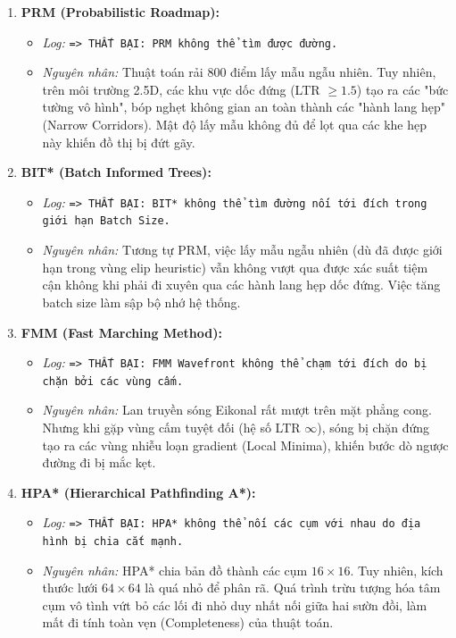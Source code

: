 \documentclass[12pt, a4paper]{article}
\begin{document}
\begin{enumerate}
    \item \textbf{PRM (Probabilistic Roadmap):}
    \begin{itemize}
        \item \textit{Log:} \texttt{=> THẤT BẠI: PRM không thể tìm được đường.}
        \item \textit{Nguyên nhân:} Thuật toán rải 800 điểm lấy mẫu ngẫu nhiên. Tuy nhiên, trên môi trường 2.5D, các khu vực dốc đứng (LTR $\geq 1.5$) tạo ra các "bức tường vô hình", bóp nghẹt không gian an toàn thành các "hành lang hẹp" (Narrow Corridors). Mật độ lấy mẫu không đủ để lọt qua các khe hẹp này khiến đồ thị bị đứt gãy.
    \end{itemize}
    \item \textbf{BIT* (Batch Informed Trees):}
    \begin{itemize}
        \item \textit{Log:} \texttt{=> THẤT BẠI: BIT* không thể tìm đường nối tới đích trong giới hạn Batch Size.}
        \item \textit{Nguyên nhân:} Tương tự PRM, việc lấy mẫu ngẫu nhiên (dù đã được giới hạn trong vùng elip heuristic) vẫn không vượt qua được xác suất tiệm cận không khi phải đi xuyên qua các hành lang hẹp dốc đứng. Việc tăng batch size làm sập bộ nhớ hệ thống.
    \end{itemize}
    \item \textbf{FMM (Fast Marching Method):}
    \begin{itemize}
        \item \textit{Log:} \texttt{=> THẤT BẠI: FMM Wavefront không thể chạm tới đích do bị chặn bởi các vùng cấm.}
        \item \textit{Nguyên nhân:} Lan truyền sóng Eikonal rất mượt trên mặt phẳng cong. Nhưng khi gặp vùng cấm tuyệt đối (hệ số LTR $\infty$), sóng bị chặn đứng tạo ra các vùng nhiễu loạn gradient (Local Minima), khiến bước dò ngược đường đi bị mắc kẹt.
    \end{itemize}
    \item \textbf{HPA* (Hierarchical Pathfinding A*):}
    \begin{itemize}
        \item \textit{Log:} \texttt{=> THẤT BẠI: HPA* không thể nối các cụm với nhau do địa hình bị chia cắt mạnh.}
        \item \textit{Nguyên nhân:} HPA* chia bản đồ thành các cụm $16 \times 16$. Tuy nhiên, kích thước lưới $64 \times 64$ là quá nhỏ để phân rã. Quá trình trừu tượng hóa tâm cụm vô tình vứt bỏ các lối đi nhỏ duy nhất nối giữa hai sườn đồi, làm mất đi tính toàn vẹn (Completeness) của thuật toán.

\end{itemize}
\end{enumerate}
\end{document}
